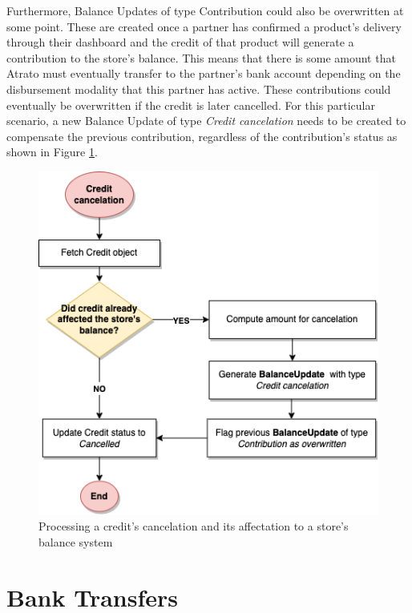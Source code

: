 Furthermore, Balance Updates of type Contribution could also be overwritten at some point. These are created once a partner has confirmed a product’s delivery through their dashboard and the credit of that product will generate a contribution to the store’s balance. This means that there is some amount that Atrato must eventually transfer to the partner’s bank account depending on the disbursement modality that this partner has active. These contributions could eventually be overwritten if the credit is later cancelled. For this particular scenario, a new Balance Update of type \textit{Credit cancelation} needs to be created to compensate the previous contribution, regardless of the contribution’s status as shown in Figure \ref{fig:dlowchart_credit_cancelation}.


\begin{figure} [H]
    \centering
    \includegraphics[scale = 0.6]{assets/flowcharts/CreditCancelation.png}
    \caption{Processing a credit's cancelation and its affectation to a store's balance system}\label{fig:dlowchart_credit_cancelation}
\end{figure}

\section{Bank Transfers}

